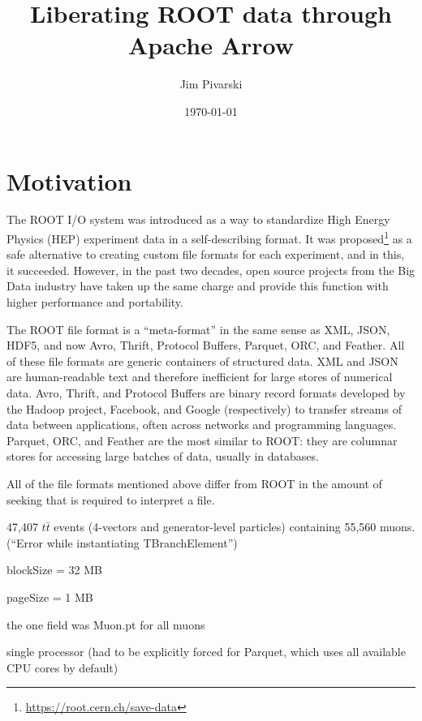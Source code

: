 \documentclass{article}
\title{Liberating ROOT data through Apache Arrow}
\author{Jim Pivarski}
\date{\today}
\begin{document}
\maketitle

\section*{Motivation}

The ROOT I/O system was introduced as a way to standardize High Energy Physics (HEP) experiment data in a self-describing format. It was proposed\footnote{\url{https://root.cern.ch/save-data}} as a safe alternative to creating custom file formats for each experiment, and in this, it succeeded. However, in the past two decades, open source projects from the Big Data industry have taken up the same charge and provide this function with higher performance and portability. 

The ROOT file format is a ``meta-format'' in the same sense as XML, JSON, HDF5, and now Avro, Thrift, Protocol Buffers, Parquet, ORC, and Feather. All of these file formats are generic containers of structured data. XML and JSON are human-readable text and therefore inefficient for large stores of numerical data. Avro, Thrift, and Protocol Buffers are binary record formats developed by the Hadoop project, Facebook, and Google (respectively) to transfer streams of data between applications, often across networks and programming languages. Parquet, ORC, and Feather are the most similar to ROOT: they are columnar stores for accessing large batches of data, usually in databases.

All of the file formats mentioned above differ from ROOT in the amount of seeking that is required to interpret a file. 




47,407 $t\bar{t}$ events (4-vectors and generator-level particles) containing 55,560 muons. (``Error while instantiating TBranchElement'')

blockSize = 32 MB

pageSize = 1 MB

the one field was Muon.pt for all muons

single processor (had to be explicitly forced for Parquet, which uses all available CPU cores by default)
\end{document}
